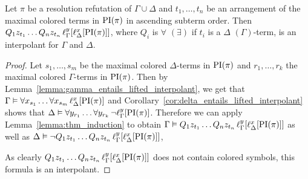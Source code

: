 \begin{thm}
	\label{thm:two_phases}
	Let $\pi$ be a resolution refutation of $\Gamma \cup \Delta$ and
	$t_1, \dots, t_n$ be an arrangement of the maximal colored terms in $\PI(\pi)$ in ascending subterm order.
	Then
	$Q_1 z_{t_1} \ldots Q_n z_{t_n}\,\lifgamma{\lifdelta{\PI(\pi)}}$, where $Q_i$ is $\forall$ $(\exists)$ if ${t_i}$ is a $\Delta$ $(\Gamma)$-term, is an interpolant for $\Gamma$ and $\Delta$.
\end{thm}
\begin{proof}
	Let $s_1, \dots, s_m$ be the maximal colored $\Delta$-terms in $\PI(\pi)$ and
	$r_1, \dots, r_k$ the maximal colored $\Gamma$-terms in $\PI(\pi)$.
	Then by Lemma~\ref{lemma:gamma_entails_lifted_interpolant}, we get that 
	$\Gamma \entails \forall x_{s_1} \ldots \forall x_{s_m}\,\lifdelta{\PI(\pi)}$
	and Corollary~\ref{cor:delta_entails_lifted_interpolant} shows that 
	$\Delta \entails \forall y_{r_1} \dots \forall y_{r_{k}}\,\lnot \lift{\Gamma}{\PI(\pi)}{y}$.
	Therefore we can apply Lemma~\ref{lemma:thm_induction} to obtain 
	$\Gamma \entails Q_1 z_{t_1} \ldots Q_n z_{t_n}\,\lifgamma{\lifdelta{\PI(\pi)}}$ 
	as well as 
	$\Delta \entails \lnot Q_1 z_{t_1} \ldots Q_n z_{t_n}\,\lifgamma{\lifdelta{\PI(\pi)}}$,

	As clearly $Q_1 z_{t_1} \dots Q_n z_{t_n}\,\lft{\Gamma}{y}{\lft{\Delta}{x}{\PI(\pi)}}$ does not contain colored symbols, this formula is an interpolant.
\end{proof}
